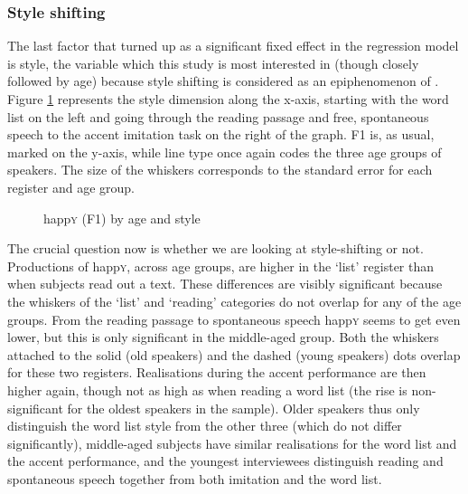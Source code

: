 \subsubsection{Style shifting}
\label{sec.prod.res.vow.happy.f1.shifting}

The last factor that turned up as a significant fixed effect in the regression model is style, the variable which this study is most interested in (though closely followed by age) because style shifting is considered as an epiphenomenon of .
Figure \ref{fig.line.f1w.happy.tot} represents the style dimension along the x-axis, starting with the word list on the left and going through the reading passage and free, spontaneous speech to the accent imitation task on the right of the graph.
F1 is, as usual, marked on the y-axis, while line type once again codes the three age groups of speakers.
The size of the whiskers corresponds to the standard error for each register and age group.

\begin{figure}[h!]
	\centering
		\resizebox{0.5\linewidth}{!}{} 
	\caption{happ\textsc{y} (F1) by age and style}
	\label{fig.line.f1w.happy.tot}
\end{figure}

The crucial question now is whether we are looking at style-shifting or not.
Productions of happ\textsc{y}, across age groups, are higher in the `list' register than when subjects read out a text.
These differences are visibly significant because the whiskers of the `list' and `reading' categories do not overlap for any of the age groups.
From the reading passage to spontaneous speech happ\textsc{y} seems to get even lower, but this is only significant in the middle-aged group.
Both the whiskers attached to the solid (old speakers) and the dashed (young speakers) dots overlap for these two registers.
Realisations during the accent performance are then higher again, though not as high as when reading a word list (the rise is non-significant for the oldest speakers in the sample).
Older speakers thus only distinguish the word list style from the other three (which do not differ significantly), middle-aged subjects have similar realisations for the word list and the accent performance, and the youngest interviewees distinguish reading and spontaneous speech together from both imitation and the word list.

